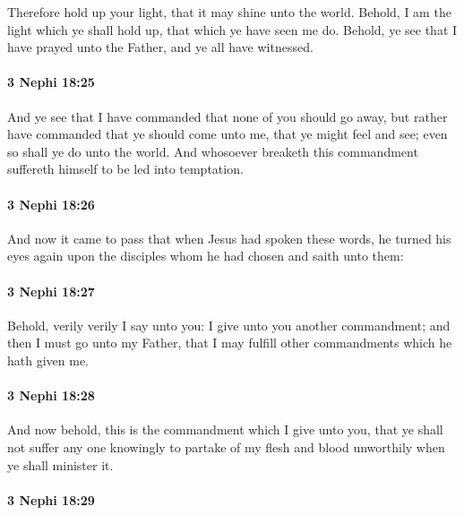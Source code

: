 			Therefore hold up your light,
			that it may shine unto the world.
			Behold, I am the light which ye shall hold up,
			that which ye have seen me do.
			Behold, ye see that I have prayed unto the Father,
			and ye all have witnessed.

		\paragraph{3 Nephi 18:25} %
			\label{3NEPHI-18-25}

			And ye see that I have commanded that none of you should go away,
			but rather have commanded that ye should come unto me,
			that ye might feel and see;
			even so shall ye do unto the world.
			And whosoever breaketh this commandment
			suffereth himself to be led into temptation.

		\paragraph{3 Nephi 18:26} %
			\label{3NEPHI-18-26}

			And now it came to pass that when Jesus had spoken these words,
			he turned his eyes again upon the disciples whom he had chosen
			and saith unto them:

		\paragraph{3 Nephi 18:27} %
			\label{3NEPHI-18-27}

			Behold, verily verily I say unto you:
			I give unto you another commandment;
			and then I must go unto my Father,
			that I may fulfill other commandments which he hath given me.

		\paragraph{3 Nephi 18:28} %
			\label{3NEPHI-18-28}

			And now behold, this is the commandment which I give unto you,
			that ye shall not suffer any one knowingly
			to partake of my flesh and blood unworthily when ye shall minister it.

		\paragraph{3 Nephi 18:29} %
			\label{3NEPHI-18-29}

